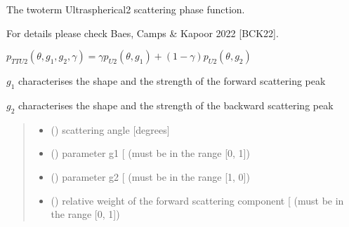 \documentclass[letterpaper,10pt,english]{sphinxmanual}
\begin{document}
\begin{fulllineitems}
\label{\detokenize{06_anisotropy_factor:skinoptics.anisotropy_factor.ptheta_TTU2}}
\pysigstartsignatures
{}
\pysigstopsignatures
\begin{DUlineblock}{0em}
\item[] The two\sphinxhyphen{}term Ultraspherical\sphinxhyphen{}2 scattering phase function.
\item[] For details please check Baes, Camps \& Kapoor 2022 {[}BCK22{]}.
\end{DUlineblock}

\sphinxAtStartPar
\(p_{TTU2}(\theta, g_1, g_2, \gamma) = \gamma p_{U2}(\theta, g_1) + (1 - \gamma) p_{U2}(\theta, g_2)\)

\sphinxAtStartPar
\(g_1\) characterises the shape and the strength of the forward scattering peak

\sphinxAtStartPar
\(g_2\) characterises the shape and the strength of the backward scattering peak
\begin{quote}\begin{description}
\begin{itemize}
\item {} 
\sphinxAtStartPar
{} () \textendash{} scattering angle {[}degrees{]}

\item {} 
\sphinxAtStartPar
{} () \textendash{} parameter g1 {[}\sphinxhyphen{}{]} (must be in the range {[}0, 1{]})

\item {} 
\sphinxAtStartPar
{} () \textendash{} parameter g2 {[}\sphinxhyphen{}{]} (must be in the range {[}\sphinxhyphen{}1, 0{]})

\item {} 
\sphinxAtStartPar
{} () \textendash{} relative weight of the forward scattering component {[}\sphinxhyphen{}{]} (must be in the range {[}0, 1{]})


\end{itemize}
\end{description}
\end{quote}
\end{fulllineitems}
\end{document}
